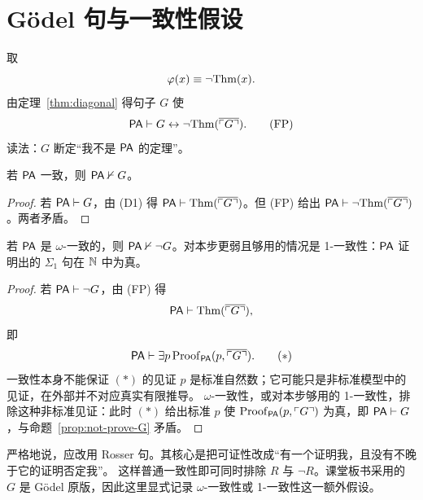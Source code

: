 \section{Gödel 句与一致性假设}\label{sec:godel}

取
\[
\varphi(x)\equiv\neg\mathrm{Thm}(x).
\]
由定理~\ref{thm:diagonal} 得句子 \(G\) 使
\[
\mathsf{PA}\vdash G\leftrightarrow \neg\mathrm{Thm}(\overline{\ulcorner G\urcorner}). \tag{FP}
\]
读法：\(G\) 断定“我不是 \(\mathsf{PA}\) 的定理”。

\begin{proposition}\label{prop:not-prove-G}
若 \(\mathsf{PA}\) 一致，则 \(\mathsf{PA}\nvdash G\)。
\end{proposition}

\begin{proof}
若 \(\mathsf{PA}\vdash G\)，由 (D1) 得 \(\mathsf{PA}\vdash\mathrm{Thm}(\overline{\ulcorner G\urcorner})\)。但 (FP) 给出
\(\mathsf{PA}\vdash\neg\mathrm{Thm}(\overline{\ulcorner G\urcorner})\)。两者矛盾。
\end{proof}

\begin{proposition}\label{prop:not-prove-neg-G}
若 \(\mathsf{PA}\) 是 \(\omega\)-一致的，则 \(\mathsf{PA}\nvdash\neg G\)。对本步更弱且够用的情况是 1-一致性：\(\mathsf{PA}\) 证明出的 \(\Sigma_1\) 句在 \(\mathbb{N}\) 中为真。
\end{proposition}

\begin{proof}
若 \(\mathsf{PA}\vdash\neg G\)，由 (FP) 得
\[
\mathsf{PA}\vdash\mathrm{Thm}(\overline{\ulcorner G\urcorner}),
\]
即
\[
\mathsf{PA}\vdash\exists p\,\mathrm{Proof}_{\mathsf{PA}}(p,\overline{\ulcorner G\urcorner}). \tag{$\ast$}
\]
一致性本身不能保证 \((\ast)\) 的见证 \(p\) 是标准自然数；它可能只是非标准模型中的见证，在外部并不对应真实有限推导。
\(\omega\)-一致性，或对本步够用的 1-一致性，排除这种非标准见证：此时 \((\ast)\) 给出标准 \(p\)
使 \(\mathrm{Proof}_{\mathsf{PA}}(p,\ulcorner G\urcorner)\) 为真，即 \(\mathsf{PA}\vdash G\)，与命题~\ref{prop:not-prove-G} 矛盾。
\end{proof}

\begin{remark}\label{rem:rosser}
严格地说，应改用 Rosser 句。其核心是把可证性改成“有一个证明我，且没有不晚于它的证明否定我”。
这样普通一致性即可同时排除 \(R\) 与 \(\neg R\)。课堂板书采用的 \(G\) 是 Gödel 原版，因此这里显式记录
\(\omega\)-一致性或 1-一致性这一额外假设。
\end{remark}
